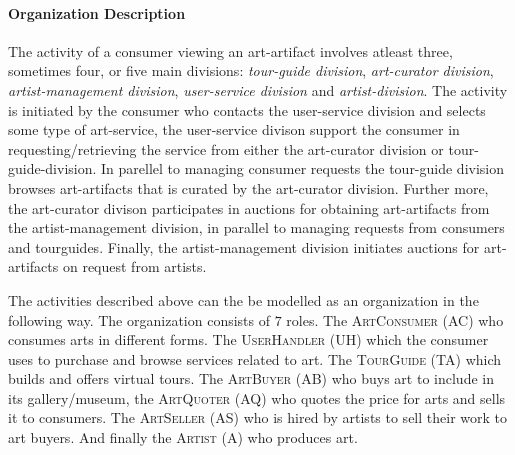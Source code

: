 \documentclass[paper=letter, fontsize=12pt]{article}
\begin{document}
\paragraph{Organization Description}
The activity of a consumer viewing an art-artifact involves atleast three, sometimes four, or five main divisions: \textit{tour-guide division}, \textit{art-curator division}, \textit{artist-management division}, \textit{user-service division} and \textit{artist-division}.
The activity is initiated by the  consumer who contacts the user-service division and selects some type of art-service, the user-service divison support the consumer in requesting/retrieving the service from either the art-curator division or tour-guide-division. In parellel to managing consumer requests the tour-guide division browses art-artifacts that is curated by the art-curator division. Further more, the art-curator divison participates in auctions for obtaining art-artifacts from the artist-management division, in parallel to managing requests from consumers and tourguides. Finally, the artist-management division initiates auctions for art-artifacts on request from artists.

The activities described above can the be modelled as an organization in the following way. The organization consists of $7$ roles. The \textsc{ArtConsumer (AC)} who consumes arts in different forms. The \textsc{UserHandler (UH)} which the consumer uses to purchase and browse services related to art. The \textsc{TourGuide (TA)} which builds and offers virtual tours. The \textsc{ArtBuyer (AB)} who buys art to include in its gallery/museum, the \textsc{ArtQuoter (AQ)} who quotes the price for arts and sells it to consumers. The \textsc{ArtSeller (AS)} who is hired by artists to sell their work to art buyers. And finally the \textsc{Artist (A)} who produces art.
\end{document}
